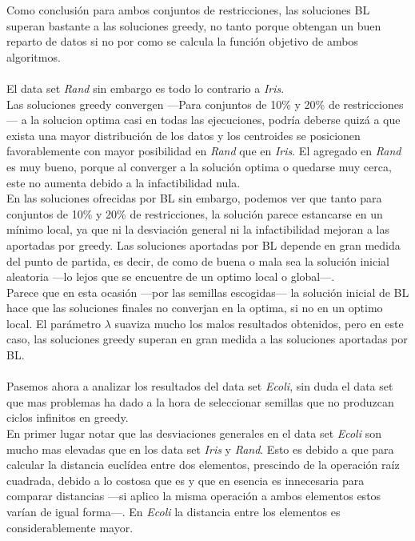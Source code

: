 Como conclusión para ambos conjuntos de restricciones, las soluciones BL superan bastante a las soluciones greedy, no tanto porque obtengan un buen reparto de datos si no por como se calcula la función objetivo de ambos algoritmos.\\
\\
El data set \emph{Rand} sin embargo es todo lo contrario a \emph{Iris}.\\
Las soluciones greedy convergen ---Para conjuntos de 10\% y 20\% de restricciones--- a la solucion optima casi en todas las ejecuciones, podría deberse quizá a que exista una mayor distribución de los datos y los centroides se posicionen favorablemente con mayor posibilidad en \emph{Rand} que en \emph{Iris}. El agregado en \emph{Rand} es muy bueno, porque al converger a la solución optima o quedarse muy cerca, este no aumenta debido a la infactibilidad nula.\\
En las soluciones ofrecidas por BL sin embargo, podemos ver que tanto para conjuntos de 10\% y 20\% de restricciones, la solución parece estancarse en un mínimo local, ya que ni la desviación general ni la infactibilidad mejoran a las aportadas por greedy. Las soluciones aportadas por BL depende en gran medida del punto de partida, es decir, de como de buena o mala sea la solución inicial aleatoria ---lo lejos que se encuentre de un optimo local o global---.\\
Parece que en esta ocasión ---por las semillas escogidas--- la solución inicial de BL hace que las soluciones finales no converjan en la optima, si no en un optimo local. El parámetro $ \lambda $ suaviza mucho los malos resultados obtenidos, pero en este caso, las soluciones greedy superan en gran medida a las soluciones aportadas por BL.\\
\\
Pasemos ahora a analizar los resultados del data set \emph{Ecoli}, sin duda el data set que mas problemas ha dado a la hora de seleccionar semillas que no produzcan ciclos infinitos en greedy.\\
En primer lugar notar que las desviaciones generales en el data set \emph{Ecoli} son mucho mas elevadas que en los data set \emph{Iris} y \emph{Rand}. Esto es debido a que para calcular la distancia euclídea entre dos elementos, prescindo de la operación raíz cuadrada, debido a lo costosa que es y que en esencia es innecesaria para comparar distancias ---si aplico la misma operación a ambos elementos estos varían de igual forma---. En \emph{Ecoli} la distancia entre los elementos es considerablemente mayor.\\

